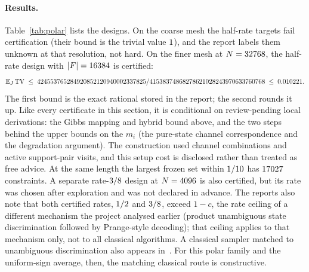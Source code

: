 \documentclass[10pt]{article}
\newcommand{\TV}{\mathrm{TV}}
\begin{document}
\paragraph{Results.} Table~\ref{tab:polar} lists the designs. On the coarse mesh the half-rate targets fail certification (their bound is the trivial value $1$), and the report labels them unknown at that resolution, not hard. On the finer mesh at $N=32768$, the half-rate design with $|F|=16384$ is certified:
\begin{equation}
\label{eq:polartv}
\mathbb{E}_J\, \TV \;\le\; \PolarTV \;\le\; \PolarTVDec .
\end{equation}
The first bound is the exact rational stored in the report; the second rounds it up. Like every certificate in this section, it is conditional on review-pending local derivations: the Gibbs mapping and hybrid bound above, and the two steps behind the upper bounds on the $m_i$ (the pure-state channel correspondence and the degradation argument). The construction used \PolarCombos{} channel combinations and \PolarVisits{} active support-pair visits, and this setup cost is disclosed rather than treated as free advice. At the same length the largest frozen set within $1/10$ has $17027$ constraints. A separate rate-$3/8$ design at $N=4096$ is also certified, but its rate was chosen after exploration and was not declared in advance. The reports also note that both certified rates, $1/2$ and $3/8$, exceed $1-c$, the rate ceiling of a different mechanism the project analysed earlier (product unambiguous state discrimination followed by Prange-style decoding); that ceiling applies to that mechanism only, not to all classical algorithms. A classical sampler matched to unambiguous discrimination also appears in~\cite{PiveteauQuekFrancoGarrido2026}. For this polar family and the uniform-sign average, then, the matching classical route is constructive.
\end{document}
